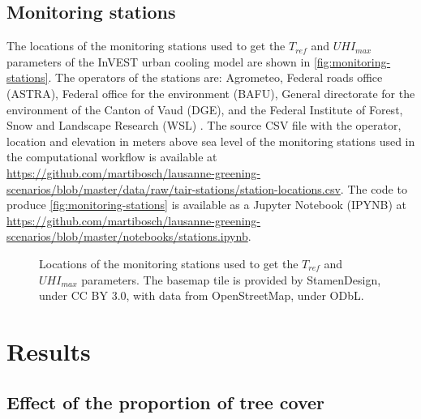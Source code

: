\documentclass[10pt,letterpaper]{article}
\begin{document}


\subsection*{Monitoring stations}
\label{sec:monitoring-stations}

The locations of the monitoring stations used to get the $T_{ref}$ and $UHI_{max}$ parameters of the InVEST urban cooling model are shown in \autoref{fig:monitoring-stations}. The operators of the stations are: Agrometeo, Federal roads office (ASTRA), Federal office for the environment (BAFU), General directorate for the environment of the Canton of Vaud (DGE), and the Federal Institute of Forest, Snow and Landscape Research (WSL) \cite{rebetez2018meteorological}.
The source CSV file with the operator, location and elevation in meters above sea level of the monitoring stations used in the computational workflow is available at \url{https://github.com/martibosch/lausanne-greening-scenarios/blob/master/data/raw/tair-stations/station-locations.csv}.
The code to produce \autoref{fig:monitoring-stations} is available as a Jupyter Notebook (IPYNB) at \url{https://github.com/martibosch/lausanne-greening-scenarios/blob/master/notebooks/stations.ipynb}.

\begin{figure}[ht]
  \centering
  \caption{\label{fig:monitoring-stations} Locations of the monitoring stations used to get the $T_{ref}$ and $UHI_{max}$ parameters. The basemap tile is provided by StamenDesign, under CC BY 3.0, with data from OpenStreetMap, under ODbL.}
\end{figure}


\section*{Results}

\subsection*{Effect of the proportion of tree cover}
\label{sec:effect-prop}
\end{document}
